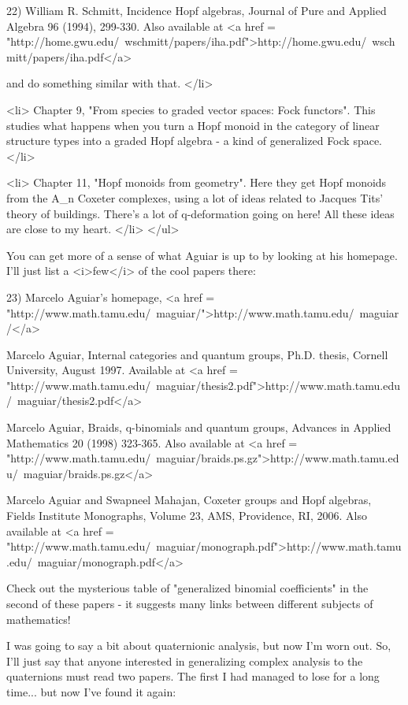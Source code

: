 22) William R. Schmitt, Incidence Hopf algebras, Journal of Pure and 
Applied Algebra 96 (1994), 299-330.   Also available at
<a href = "http://home.gwu.edu/~wschmitt/papers/iha.pdf">http://home.gwu.edu/~wschmitt/papers/iha.pdf</a>

and do something similar with that.
</li>

<li>
Chapter 9, "From species to graded vector spaces: Fock functors".
This studies what happens when you turn a Hopf monoid in the 
category of linear structure types into a graded Hopf algebra -
a kind of generalized Fock space.
</li>

<li>
Chapter 11, "Hopf monoids from geometry".  Here they get Hopf
monoids from the A_{n} Coxeter complexes, using a lot of ideas related
to Jacques Tits' theory of buildings.  There's a lot of q-deformation
going on here!  All these ideas are close to my heart.
</li>
</ul>

You can get more of a sense of what Aguiar is up to by looking at 
his homepage.  I'll just list a <i>few</i> of the cool papers there:

23) Marcelo Aguiar's homepage, <a href = "http://www.math.tamu.edu/~maguiar/">http://www.math.tamu.edu/~maguiar/</a>

Marcelo Aguiar, Internal categories and quantum groups, Ph.D. thesis,
Cornell University, August 1997.  Available at
<a href = "http://www.math.tamu.edu/~maguiar/thesis2.pdf">http://www.math.tamu.edu/~maguiar/thesis2.pdf</a>

Marcelo Aguiar, Braids, q-binomials and quantum groups, Advances in 
Applied Mathematics 20 (1998) 323-365.  Also available at
<a href = "http://www.math.tamu.edu/~maguiar/braids.ps.gz">http://www.math.tamu.edu/~maguiar/braids.ps.gz</a>

Marcelo Aguiar and Swapneel Mahajan, Coxeter groups and Hopf 
algebras, Fields Institute Monographs, Volume 23, AMS, Providence, RI,
2006.  Also available at <a href = "http://www.math.tamu.edu/~maguiar/monograph.pdf">http://www.math.tamu.edu/~maguiar/monograph.pdf</a>

Check out the mysterious table of "generalized binomial
coefficients" in the second of these papers - it suggests
many links between different subjects of mathematics!

I was going to say a bit about quaternionic analysis, but now I'm
worn out.  So, I'll just say that anyone interested in generalizing
complex analysis to the quaternions must read two papers.  The first
I had managed to lose for a long time... but now I've found it again:


